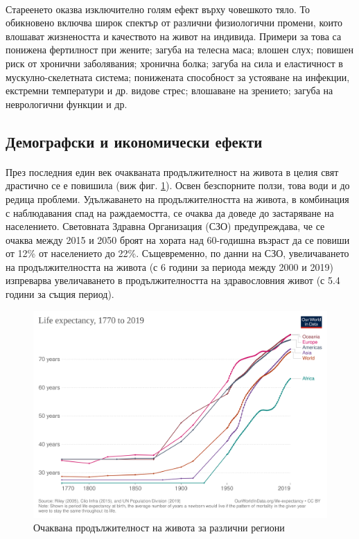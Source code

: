 \documentclass[pdftex,cyrillic,14pt,a4page,twoside]{extreport}
\begin{document}
\paragraph{}
Стареенето оказва изключително голям ефект върху човешкото тяло. То обикновено включва широк спектър от различни физиологични промени, които влошават жизнеността и качеството на живот на индивида. Примери за това са понижена фертилност при жените\cite{kamath2010}; загуба на телесна маса\cite{spencer1996}; влошен слух\cite{feder2015}; повишен риск от хронични заболявания\cite{larson2013}\cite{prasad2012}; хронична болка\cite{geriatrics2002}; загуба на сила и еластичност в мускулно-скелетната система; понижената способност за устояване на инфекции, екстремни температури и др. видове стрес; влошаване на зрението; загуба на неврологични функции\cite{vina2007} и др.


\subsection{Демографски и икономически ефекти}
\paragraph{}
През последния един век очакваната продължителност на живота в целия свят драстично се е повишила\cite{zijdeman2016} (виж фиг. \ref{fig:life_expectancy}). Освен безспорните ползи, това води и до редица проблеми. Удължаването на продължителността на живота, в комбинация с наблюдавания спад на раждаемостта, се очаква да доведе до застаряване на населението\cite{lutz2008}. Световната Здравна Организация (СЗО) предупреждава, че се очаква между 2015 и 2050 броят на хората над 60-годишна възраст да се повиши от 12\% от населението до 22\%\cite{who_report_ageing2015}. Същевременно, по данни на СЗО, увеличаването на продължителността на живота (с 6 години за периода между 2000 и 2019) изпреварва увеличаването в продължителността на здравословния живот (с 5.4 години за същия период)\cite{who_health2020}. \\
\begin{figure}[h]
  \centering
  \includegraphics[width=12cm]{figures/life-expectancy}
  \caption {Очаквана продължителност на живота за различни региони}
  \label{fig:life_expectancy}
\end{figure}
\end{document}
